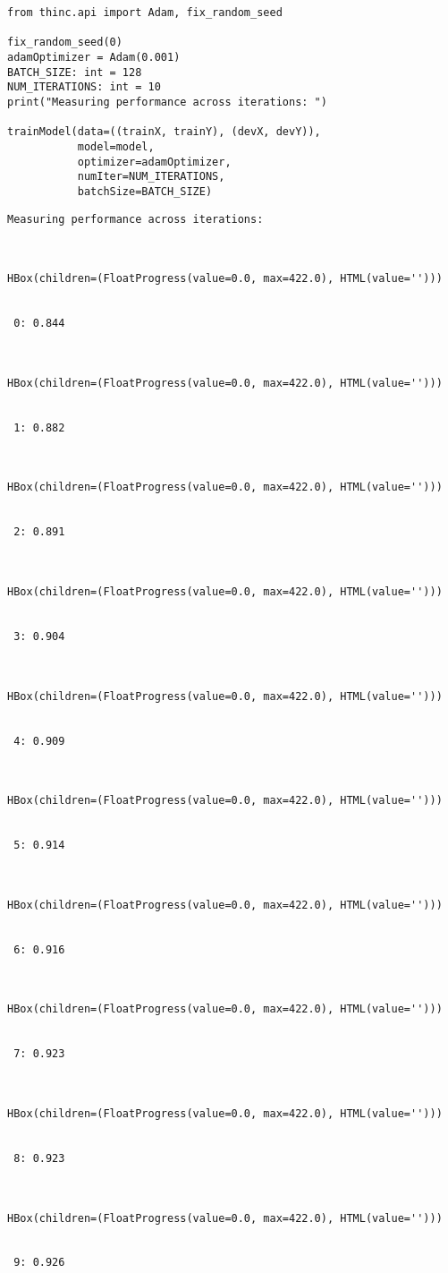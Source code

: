 \documentclass[
]{article}
\begin{document}
\begin{verbatim}
from thinc.api import Adam, fix_random_seed

fix_random_seed(0)
adamOptimizer = Adam(0.001)
BATCH_SIZE: int = 128
NUM_ITERATIONS: int = 10
print("Measuring performance across iterations: ")

trainModel(data=((trainX, trainY), (devX, devY)),
           model=model,
           optimizer=adamOptimizer,
           numIter=NUM_ITERATIONS,
           batchSize=BATCH_SIZE)
\end{verbatim}

\begin{verbatim}
Measuring performance across iterations: 



HBox(children=(FloatProgress(value=0.0, max=422.0), HTML(value='')))


 0: 0.844



HBox(children=(FloatProgress(value=0.0, max=422.0), HTML(value='')))


 1: 0.882



HBox(children=(FloatProgress(value=0.0, max=422.0), HTML(value='')))


 2: 0.891



HBox(children=(FloatProgress(value=0.0, max=422.0), HTML(value='')))


 3: 0.904



HBox(children=(FloatProgress(value=0.0, max=422.0), HTML(value='')))


 4: 0.909



HBox(children=(FloatProgress(value=0.0, max=422.0), HTML(value='')))


 5: 0.914



HBox(children=(FloatProgress(value=0.0, max=422.0), HTML(value='')))


 6: 0.916



HBox(children=(FloatProgress(value=0.0, max=422.0), HTML(value='')))


 7: 0.923



HBox(children=(FloatProgress(value=0.0, max=422.0), HTML(value='')))


 8: 0.923



HBox(children=(FloatProgress(value=0.0, max=422.0), HTML(value='')))


 9: 0.926
\end{verbatim}
\end{document}
